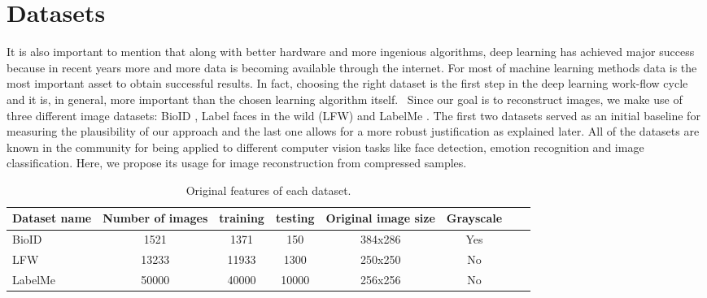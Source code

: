 \FloatBarrier

\section{Datasets}
It is also important to mention that along with better hardware and more ingenious algorithms, deep learning has achieved major success because in recent years more and more data is becoming available through the internet. For most of machine learning methods data is the most important asset to obtain successful results. In fact, choosing the right dataset is the first step in the deep learning work-flow cycle and it is, in general, more important than the chosen learning algorithm itself. \
Since our goal is to reconstruct images, we make use of three different image datasets: BioID \cite{frischholz2003bioid}, Label faces in the wild (LFW) \cite{LFWTech} and LabelMe \cite{russell2008labelme}. The first two datasets served as an initial baseline for measuring the plausibility of our approach and the last one allows for a more robust justification as explained later. All of the datasets are known in the community for being applied to different computer vision tasks like face detection, emotion recognition and image classification. Here, we propose its usage for image reconstruction from compressed samples. 
\begin{table}[tb]
\caption[Datasets for training and testing]{Original features of each dataset.}
\label{tab:datasets1}
\centering
\begin{tabular}{l*{6}{c}r}
Dataset name              & Number of images & training & testing &  Original image size& Grayscale \\
\hline
BioID   & 1521 & 1371 & 150 & 384x286 & Yes\\
LFW     & 13233 & 11933 & 1300 & 250x250 & No\\
LabelMe & 50000 & 40000 & 10000 & 256x256 & No\\
\bottomrule 
\end{tabular}  
\end{table}

